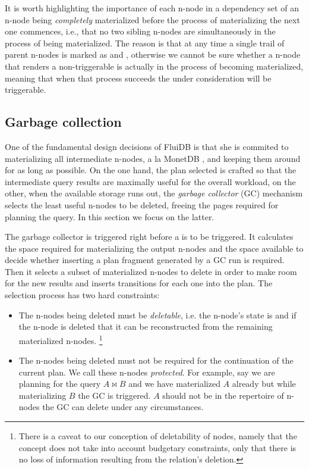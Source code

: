 It is worth highlighting the importance of each n-node in a dependency set of an n-node
being \emph{completely} materialized before the process of materializing the
next one commences, i.e., that no two sibling n-nodes are
simultaneously in the process of being materialized. The reason is
that at any time a single trail of parent n-nodes is marked as
 and , otherwise we cannot be sure whether a
 n-node that renders a 
non-triggerable is actually in the process of becoming materialized,
meaning that when that process succeeds the  under
consideration will be triggerable.

\subsection{Garbage collection}
\label{sec:gc}

One of the fundamental design decisions of FluiDB is that she is
commited to materializing all intermediate n-nodes, a la MonetDB \cite{monetdb}, and keeping them
around for as long as possible. On the one hand, the plan selected is
crafted so that the intermediate query results are maximally useful for the
overall workload, on the other, when the available storage runs out,
the \emph{garbage collector} (GC) mechanism selects the least useful n-nodes to be
deleted, freeing the pages required for planning the query. In this section
we focus on the latter.

The garbage collector is triggered right before a  is to
be triggered. It calculates the space required for materializing the
output n-nodes and the space available to decide whether inserting a
plan fragment generated by a GC run is required. Then it selects a
subset of materialized n-nodes to delete in order to make room for the
new results and inserts  transitions for each one into the
plan. The selection process has two hard constraints:

\begin{itemize}
\item The n-nodes being deleted must be \emph{deletable}, i.e. the
  n-node's state is  and if the n-node is deleted that it
  can be reconstructed from the remaining materialized n-nodes.
  \footnote{There is a caveat to our conception of deletability of nodes, namely that
  the concept does not take into account budgetary constraints, only that there is no
  loss of information resulting from the relation's deletion.}
\item The n-nodes being deleted must not be required for the
  continuation of the current plan. We call these n-nodes
  \emph{protected}. For example, say we are planning for the query
  \(A \Join B\) and we have materialized \(A\) already but while
  materializing \(B\) the GC is triggered. \(A\) should not be in the
  repertoire of n-nodes the GC can delete under any circumstances.
\end{itemize}

